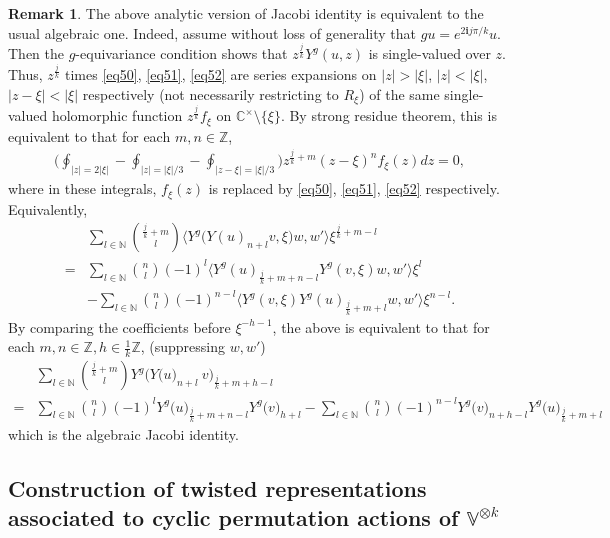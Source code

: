 \documentclass[12pt,a4paper,notitlepage]{article}
\theoremstyle{definition}
\newtheorem{rem}[df]{Remark}
\theoremstyle{plain}
\newcommand{\im}{\mathbf{i}}
\newcommand{\Vbb}{\mathbb V}
\newcommand{\Cbb}{\mathbb C}
\newcommand{\Nbb}{\mathbb N}
\newcommand{\Zbb}{\mathbb Z}
\numberwithin{equation}{section}
\begin{document}
\begin{rem}
The above analytic version of Jacobi identity is equivalent to the usual algebraic one. Indeed, assume without loss of generality that $gu=e^{2\im j\pi/k}u$. Then the $g$-equivariance condition shows that $z^{\frac jk}Y^g(u,z)$ is single-valued over $z$. Thus,  $z^{\frac jk}$ times \eqref{eq50}, \eqref{eq51}, \eqref{eq52} are series expansions on $|z|>|\xi|$, $|z|<|\xi|$, $|z-\xi|<|\xi|$ respectively (not necessarily restricting to $R_\xi$) of the same single-valued holomorphic function $z^{\frac jk}f_\xi$ on $\Cbb^\times\setminus\{\xi\}$. By strong residue theorem, this is equivalent to that for each $m,n\in\Zbb$,
\begin{align*}
\Big(\oint_{|z|=2|\xi|}-\oint_{|z|=|\xi|/3}-\oint_{|z-\xi|=|\xi|/3}\Big)z^{\frac jk+m}(z-\xi)^nf_\xi(z)dz=0,
\end{align*}
where in these integrals, $f_\xi(z)$ is replaced by \eqref{eq50}, \eqref{eq51}, \eqref{eq52} respectively. Equivalently,
\begin{align}
&\sum_{l\in\Nbb}{\frac jk+m\choose l}\big\langle Y^g\big(Y(u)_{n+l}v,\xi\big)w,w'\big\rangle\xi^{\frac jk+m-l}\nonumber	\\
=&\sum_{l\in\Nbb}{n\choose l}(-1)^l\big\langle Y^g(u)_{\frac jk+m+n-l}Y^g(v,\xi)w,w'\big\rangle\xi^l \nonumber\\
&-\sum_{l\in\Nbb}{n\choose l}(-1)^{n-l}\big\langle Y^g(v,\xi)Y^g(u)_{\frac jk+m+l}w,w'\big\rangle\xi^{n-l}.
\end{align}
By comparing the coefficients before $\xi^{-h-1}$, the above is equivalent to that for each $m,n\in\Zbb,h\in\frac 1k\Zbb$, (suppressing $w,w'$)
\begin{align}
&\sum_{l\in\Nbb}{\frac jk+m\choose l} Y^g\big(Y\big(u\big)_{n+l}~v\big)_{\frac jk+m+h-l}  \nonumber\\
=&\sum_{l\in\Nbb}{n\choose l}(-1)^l Y^g\big(u\big)_{\frac jk+m+n-l}Y^g\big(v\big)_{h+l}-\sum_{l\in\Nbb}{n\choose l}(-1)^{n-l}Y^g\big(v\big)_{n+h-l}Y^g\big(u\big)_{\frac jk+m+l}	
\end{align}
which is the algebraic Jacobi identity.
\end{rem}




\subsection*{Construction of twisted representations associated to cyclic permutation actions of $\Vbb^{\otimes k}$}
\end{document}
